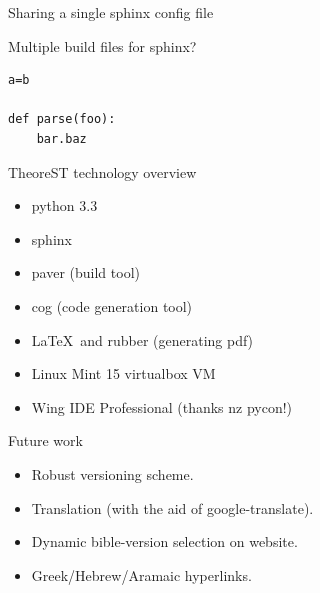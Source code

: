 \documentclass{beamer}
\begin{document}
\begin{frame}{Sharing a single sphinx config file}
\end{frame}

\begin{frame}[fragile]{Multiple build files for sphinx?}


\begin{verbatim}
a=b

def parse(foo):
    bar.baz
\end{verbatim}
\end{frame}

\begin{frame}{TheoreST technology overview}
\begin{itemize}
\item python 3.3
\item sphinx
\item paver (build tool)
\item cog (code generation tool)
\item \LaTeX\  and rubber (generating pdf)
\item Linux Mint 15 virtualbox VM
\item Wing IDE Professional (thanks nz pycon!)
\end{itemize}
\end{frame}

\begin{frame}{Future work}
\begin{itemize}
\item Robust versioning scheme.
\item Translation (with the aid of google-translate).
\item Dynamic bible-version selection on website.
\item Greek/Hebrew/Aramaic hyperlinks.
\end{itemize}

\end{frame}
\end{document}
